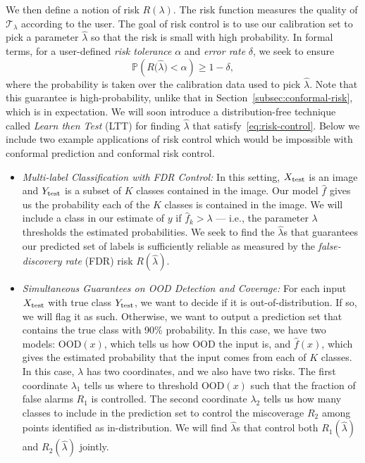 \documentclass[10pt]{article}
\newcommand{\T}{\mathcal{T}}
\newcommand{\lhat}{\hat{\lambda}}
\renewcommand{\P}{\mathbb{P}}
\begin{document}
We then define a notion of risk $R(\lambda)$.
The risk function measures the quality of $\T_{\lambda}$ according to the user.
The goal of risk control is to use our calibration set to pick a parameter $\lhat$ so that the risk is small with high probability.
In formal terms, for a user-defined \emph{risk tolerance} $\alpha$ and \emph{error rate} $\delta$, we seek to ensure
\begin{equation}
    \label{eq:risk-control}
    \P\left( R\big(\hat{\lambda}\big) < \alpha \right) \geq 1-\delta,
\end{equation}
where the probability is taken over the calibration data used to pick $\lhat$.
Note that this guarantee is high-probability, unlike that in Section~\ref{subsec:conformal-risk}, which is in expectation.
We will soon introduce a distribution-free technique called \emph{Learn then Test} (LTT) for finding $\lhat$ that satisfy~\eqref{eq:risk-control}.
Below we include two example applications of risk control which would be impossible with conformal prediction and conformal risk control.
\begin{itemize}
    \item {\em Multi-label Classification with FDR Control:}
    In this setting, $X_{\rm test}$ is an image and $Y_{\rm test}$ is a subset of $K$ classes contained in the image.
    Our model $\hat{f}$ gives us the probability each of the $K$ classes is contained in the image.
    We will include a class in our estimate of $y$ if $\hat{f}_k > \lambda$ --- i.e., the parameter $\lambda$ thresholds the estimated probabilities.
    We seek to find the $\lhat$s that guarantees our predicted set of labels is sufficiently reliable as measured by the \emph{false-discovery rate} (FDR) risk $R(\lhat)$.
    
    \item {\em Simultaneous Guarantees on OOD Detection and Coverage:} For each input $X_{\rm test}$ with true class $Y_{\rm test}$, we want to decide if it is out-of-distribution.
    If so, we will flag it as such.
    Otherwise, we want to output a prediction set that contains the true class with 90\% probability.
    In this case, we have two models: $\mathrm{OOD}(x)$, which tells us how OOD the input is, and $\hat{f}(x)$, which gives the estimated probability that the input comes from each of $K$ classes.
    In this case, $\lambda$ has two coordinates, and we also have two risks.
    The first coordinate $\lambda_1$ tells us where to threshold $\mathrm{OOD}(x)$ such that the fraction of false alarms $R_1$ is controlled.
    The second coordinate $\lambda_2$ tells us how many classes to include in the prediction set to control the miscoverage $R_2$ among points identified as in-distribution.
    We will find $\lhat$s that control both $R_1(\lhat)$ and $R_2(\lhat)$ jointly.
\end{itemize}
\end{document}
